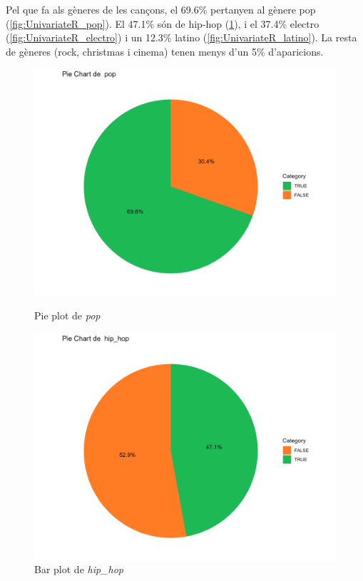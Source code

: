 Pel que fa als gèneres de les cançons, el 69.6\% pertanyen al gènere pop (\ref{fig:UnivariateR_pop}). El 47.1\% són de hip-hop (\ref{fig:UnivariateR_hiphop}), i el 37.4\% electro (\ref{fig:UnivariateR_electro}) i un 12.3\% latino (\ref{fig:UnivariateR_latino}). La resta de gèneres (rock, christmas i cinema) tenen menys d'un 5\% d'aparicions.

\begin{figure}[H]
\centering
    \begin{minipage}{.4\textwidth}
        \centering
        \includegraphics[width=0.95\linewidth]{Images/2_Univariate/pie_pop.png}
        \caption{Pie plot de \textit{pop}}
        \label{fig:UnivariateR_pop}
    \end{minipage}%
    \begin{minipage}{.4\textwidth}
        \centering
        \includegraphics[width=0.95\linewidth]{Images/2_Univariate/pie_hip_hop.png}
        \caption{Bar plot de \textit{hip\_hop}}
        \label{fig:UnivariateR_hiphop}
    \end{minipage}%
\end{figure}

